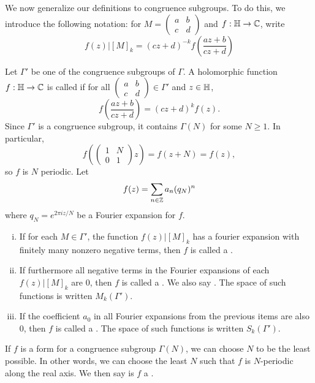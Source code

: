 \documentclass[12pt, a4paper]{amsart}
\begin{document}
We now generalize our definitions to congruence subgroups. To do this, we
introduce the following notation: for $M = \left(
  \begin{smallmatrix}
    a & b \\ c & d
  \end{smallmatrix}
\right)$ and $f : \mathbb{H} \rightarrow {\mathbb C}$, write
\[f (z) | [M]_k = (cz+d)^{-k} f\left( \frac{az+b}{cz+d} \right)\]

\begin{defn}
  Let $\Gamma'$ be one of the congruence subgroups of $\Gamma$. A holomorphic
  function $f: \mathbb{H} \rightarrow {\mathbb C}$ is called  if for all 
  $\left( 
    \begin{smallmatrix}
      a & b \\ c & d
    \end{smallmatrix}
  \right) \in \Gamma'$ and $z \in \mathbb{H}$,
  \[f \left( \frac{az+b}{cz+d} \right) = (cz+d)^k f(z). \]
  Since $\Gamma'$ is a congruence subgroup, it contains $\Gamma(N)$ for some $N
  \geq 1$. In particular,  $$f \left( \left( 
    \begin{smallmatrix}
      1 & N \\ 0 & 1
    \end{smallmatrix}
  \right) z \right) = f(z+N) = f(z),  $$
  so $f$ is $N$ periodic. Let 
  \[f(z) = \sum\limits_{n \in {\mathbb Z}} a_n(q_N)^n \]
  where $q_N = e^{2\pi i z/N}$ be a Fourier expansion for $f$. 

  \begin{enumerate}[(i)]
  \item If for each $M \in \Gamma'$, the function $f(z) | [M]_k$ has a
  fourier expansion with finitely many nonzero negative terms, then $f$ is
  called a .
\item If furthermore all negative terms in the Fourier expansions of each
  $f(z) | [M]_k$
  are 0, then $f$ is called a . We also say .
  The space of such functions is written $M_k(\Gamma').$
  \item If the coefficient $a_0$ in all Fourier expansions from the previous
    items are also 0, then $f$ is called a . The space of such functions is written $S_k(\Gamma').$
  \end{enumerate}
\end{defn}

If $f$ is a form for a congruence subgroup $\Gamma(N)$, we can choose $N$ to be
the least possible. In other words, we can choose the least $N$ such that $f$ is
$N$-periodic along the real axis. We then say is $f$ a .
\end{document}
